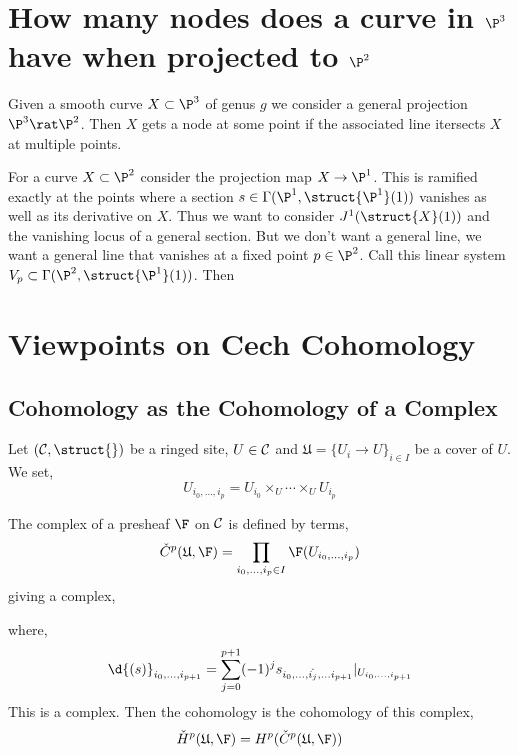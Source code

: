 \documentclass[12pt]{article}
\begin{document}
\section{How many nodes does a curve in $\P^3$ have when projected to $\P^2$}

Given a smooth curve $X \subset \P^3$ of genus $g$ we consider a general projection $\P^3 \rat \P^2$. Then $X$ gets a node at some point if the associated line itersects $X$ at multiple points. 


For a curve $X \subset \P^2$ consider the projection map $X \to \P^1$. This is ramified exactly at the points where a section $s \in \Gamma(\P^1, \struct{\P^1}(1))$ vanishes as well as its derivative on $X$. Thus we want to consider $J^1(\struct{X}(1))$ and the vanishing locus of a general section. But we don't want a general line, we want a general line that vanishes at a fixed point $p \in \P^2$. Call this linear system $V_p \subset \Gamma(\P^2, \struct{\P^1}(1))$. Then 

\section{Viewpoints on Cech Cohomology}

\newcommand{\fU}{\mathfrak{U}}
\newcommand{\cechH}{\check{H}}

\subsection{\cech Cohomology as the Cohomology of a Complex}

Let $(\C, \struct{})$ be a ringed site, $U \in \mathcal{C}$ and $\fU = \{ U_i \to U \}_{i \in I}$ be a cover of $U$. We set,
\[ U_{i_0, \dots, i_p} = U_{i_0} \times_U \cdots \times_U U_{i_p} \]

\begin{defn}
The \cech complex of a presheaf $\F$ on $\mathcal{C}$ is defined by terms,
\[ \check{C}^p(\fU, \F) = \prod_{i_0, \dots, i_p \in I} \F(U_{i_0, \dots, i_p}) \]
giving a complex,
\begin{center}
\end{center}
where,
\[ \d{(s)}_{i_0, \dots, i_{p+1}} = \sum_{j = 0}^{p+1} (-1)^j s_{i_0, \dots, \hat{i_j}, \dots i_{p+1}} |_{U_{i_0, \dots, i_{p+1}}} \]
This is a complex. Then the \cech cohomology is the cohomology of this complex,
\[ \cechH^p(\fU, \F) = H^p(\check{C}^p(\fU, \F)) \]
\end{defn}
\end{document}

